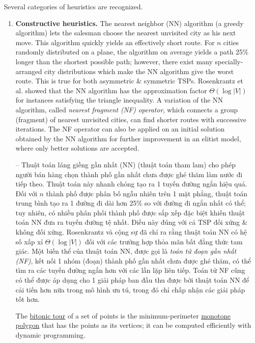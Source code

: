 \documentclass{article}
\begin{document}
Several categories of heuristics are recognized. 
\begin{enumerate}
    \item {\bf Constructive heuristics.} The nearest neighbor (NN) algorithm (a greedy algorithm) lets the salesman choose the nearest unvisited city as his next move. This algorithm quickly yields an effectively short route. For $n$ cities randomly distributed on a plane, the algorithm on average yields a path 25\% longer than the shortest possible path; however, there exist many specially-arranged city distributions which make the NN algorithm give the worst route. This is true for both asymmetric \& symmetric TSPs. Rosenkrantz et al. showed that the NN algorithm has the approximation factor $\Theta(\log|V|)$ for instances satisfying the triangle inequality. A variation of the NN algorithm, called {\it nearest fragment (NF) operator}, which connects a group (fragment) of nearest unvisited cities, can find shorter routes with successive iterations. The NF operator can also be applied on an initial solution obtained by the NN algorithm for further improvement in an elitist model, where only better solutions are accepted.
    
    -- Thuật toán láng giềng gần nhất (NN) (thuật toán tham lam) cho phép người bán hàng chọn thành phố gần nhất chưa được ghé thăm làm nước đi tiếp theo. Thuật toán này nhanh chóng tạo ra 1 tuyến đường ngắn hiệu quả. Đối với $n$ thành phố được phân bố ngẫu nhiên trên 1 mặt phẳng, thuật toán trung bình tạo ra 1 đường đi dài hơn 25\% so với đường đi ngắn nhất có thể; tuy nhiên, có nhiều phân phối thành phố được sắp xếp đặc biệt khiến thuật toán NN đưa ra tuyến đường tệ nhất. Điều này đúng với cả TSP đối xứng \& không đối xứng. Rosenkrantz và cộng sự đã chỉ ra rằng thuật toán NN có hệ số xấp xỉ $\Theta(\log|V|)$ đối với các trường hợp thỏa mãn bất đẳng thức tam giác. Một biến thể của thuật toán NN, được gọi là {\it toán tử đoạn gần nhất (NF)}, kết nối 1 nhóm (đoạn) thành phố gần nhất chưa được ghé thăm, có thể tìm ra các tuyến đường ngắn hơn với các lần lặp liên tiếp. Toán tử NF cũng có thể được áp dụng cho 1 giải pháp ban đầu thu được bởi thuật toán NN để cải tiến hơn nữa trong mô hình ưu tú, trong đó chỉ chấp nhận các giải pháp tốt hơn.
    
    The \href{https://en.wikipedia.org/wiki/Bitonic_tour}{bitonic tour} of a set of points is the minimum-perimeter \href{https://en.wikipedia.org/wiki/Monotone_polygon}{monotone polygon} that has the points as its vertices; it can be computed efficiently with dynamic programming.
    

\end{enumerate}
\end{document}
